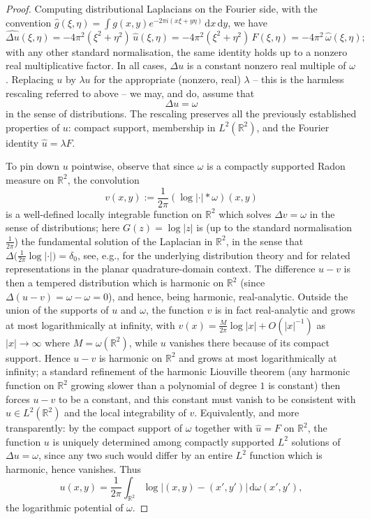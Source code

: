 \documentclass[a4paper,11pt,reqno]{amsart}
\numberwithin{equation}{section}
\theoremstyle{plain} %
\theoremstyle{definition} %
\theoremstyle{remark}
\newcommand{\R}{\mathbb{R}}
\begin{document}
\begin{proof}
Computing distributional Laplacians on the Fourier side, with the
convention $\widehat g(\xi,\eta)=\int g(x,y)e^{-2\pi i(x\xi+y\eta)}\,
\mathrm{d}x\,\mathrm{d}y$, we have
\[
\widehat{\Delta u}(\xi,\eta) = -4\pi^2(\xi^2+\eta^2)\,\widehat{u}(\xi,\eta)
= -4\pi^2(\xi^2+\eta^2)\,F(\xi,\eta) = -4\pi^2\,\widehat\omega(\xi,\eta);
\]
with any other standard normalisation, the same identity holds up to a
nonzero real multiplicative factor. In all cases, $\Delta u$ is a constant
nonzero real multiple of $\omega$. Replacing $u$ by $\lambda u$ for the
appropriate (nonzero, real) $\lambda$ -- this is the harmless rescaling
referred to above -- we may, and do, assume that
\[
\Delta u = \omega
\]
in the sense of distributions. The rescaling preserves all the previously
established properties of $u$: compact support, membership in $L^2(\R^2)$,
and the Fourier identity $\widehat u = \lambda F$.

To pin down $u$ pointwise, observe that since $\omega$ is a compactly
supported Radon measure on $\R^2$, the convolution
\[
v(x,y) := \frac{1}{2\pi}(\log|\cdot|*\omega)(x,y)
\]
is a well-defined locally integrable function on $\R^2$ which solves
$\Delta v = \omega$ in the sense of distributions; here $G(z)=\log|z|$ is
(up to the standard normalisation $\tfrac{1}{2\pi}$) the fundamental solution
of the Laplacian in $\R^2$, in the sense that
$\Delta\bigl(\tfrac{1}{2\pi}\log|\cdot|\bigr)=\delta_0$, see, e.g.,
\cite{Hormander} for the underlying distribution theory and
\cite{Aharonov-Schiffer-Zalcman} for related representations in the planar
quadrature-domain context.
The difference $u-v$ is then a tempered
distribution which is harmonic on $\R^2$ (since
$\Delta(u-v)=\omega-\omega=0$), and hence, being harmonic, real-analytic.
Outside the union of the supports of $u$ and $\omega$, the function $v$ is
in fact real-analytic and grows at most logarithmically at infinity, with
$v(x)=\frac{M}{2\pi}\log|x|+O(|x|^{-1})$ as $|x|\to\infty$ where
$M=\omega(\R^2)$, while $u$ vanishes there because of its compact support.
Hence $u-v$ is harmonic on $\R^2$ and grows at most logarithmically at
infinity; a standard refinement of the harmonic Liouville theorem (any
harmonic function on $\R^2$ growing slower than a polynomial of degree $1$
is constant) then forces $u-v$ to be a constant, and this constant must
vanish to be consistent with $u\in L^2(\R^2)$ and the local integrability
of $v$. Equivalently, and more transparently: by the compact support of
$\omega$ together with $\widehat u = F$ on $\R^2$, the function $u$ is
uniquely determined among compactly supported $L^2$ solutions of
$\Delta u = \omega$, since any two such would differ by an entire $L^2$
function which is harmonic, hence vanishes. Thus
\[
u(x,y)=\frac{1}{2\pi}\int_{\R^2}\log|(x,y)-(x',y')|\,\mathrm{d}\omega(x',y'),
\]
the logarithmic potential of $\omega$.


\end{proof}
\end{document}
